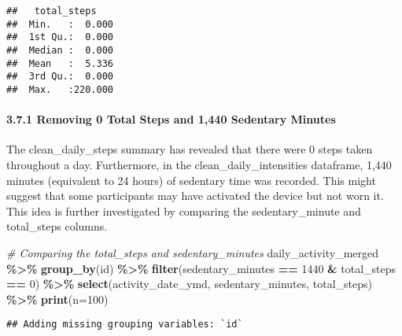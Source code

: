 \documentclass[
]{article}
\newenvironment{Shaded}{\begin{snugshade}}{\end{snugshade}}
\newcommand{\AttributeTok}[1]{\textcolor[rgb]{0.13,0.29,0.53}{#1}}
\newcommand{\CommentTok}[1]{\textcolor[rgb]{0.56,0.35,0.01}{\textit{#1}}}
\newcommand{\DecValTok}[1]{\textcolor[rgb]{0.00,0.00,0.81}{#1}}
\newcommand{\FunctionTok}[1]{\textcolor[rgb]{0.13,0.29,0.53}{\textbf{#1}}}
\newcommand{\NormalTok}[1]{#1}
\newcommand{\SpecialCharTok}[1]{\textcolor[rgb]{0.81,0.36,0.00}{\textbf{#1}}}
\begin{document}
\begin{verbatim}
##   total_steps     
##  Min.   :  0.000  
##  1st Qu.:  0.000  
##  Median :  0.000  
##  Mean   :  5.336  
##  3rd Qu.:  0.000  
##  Max.   :220.000
\end{verbatim}

\hypertarget{removing-0-total-steps-and-1440-sedentary-minutes}{%
\paragraph{3.7.1 Removing 0 Total Steps and 1,440 Sedentary
Minutes}\label{removing-0-total-steps-and-1440-sedentary-minutes}}

The clean\_daily\_steps summary has revealed that there were 0 steps
taken throughout a day. Furthermore, in the clean\_daily\_intensities
dataframe, 1,440 minutes (equivalent to 24 hours) of sedentary time was
recorded. This might suggest that some participants may have activated
the device but not worn it. This idea is further investigated by
comparing the sedentary\_minute and total\_steps columns.

\begin{Shaded}
\begin{Highlighting}[]
\CommentTok{\# Comparing the total\_steps and sedentary\_minutes}
\NormalTok{daily\_activity\_merged }\SpecialCharTok{\%\textgreater{}\%} 
  \FunctionTok{group\_by}\NormalTok{(id) }\SpecialCharTok{\%\textgreater{}\%} 
  \FunctionTok{filter}\NormalTok{(sedentary\_minutes }\SpecialCharTok{==} \DecValTok{1440} \SpecialCharTok{\&}\NormalTok{ total\_steps }\SpecialCharTok{==} \DecValTok{0}\NormalTok{) }\SpecialCharTok{\%\textgreater{}\%} 
  \FunctionTok{select}\NormalTok{(activity\_date\_ymd, sedentary\_minutes, total\_steps) }\SpecialCharTok{\%\textgreater{}\%} 
  \FunctionTok{print}\NormalTok{(}\AttributeTok{n=}\DecValTok{100}\NormalTok{)}
\end{Highlighting}
\end{Shaded}

\begin{verbatim}
## Adding missing grouping variables: `id`
\end{verbatim}
\end{document}
